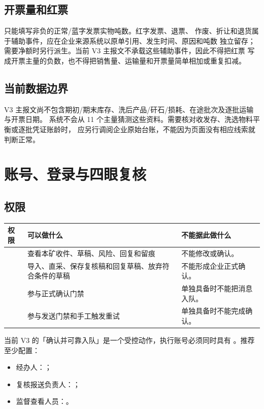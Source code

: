 \documentclass[UTF8,openany,zihao=-4,fontset=none]{ctexbook}
\begin{document}
\section{开票量和红票}

 只能填写非负的正常/蓝字发票实物吨数。红字发票、退票、
作废、折让和退货属于辅助事件，应在企业来源系统以原单引用、发生时间、原因和吨数
独立留存；需要净额时另行派生。当前 V3 主报文不承载这些辅助事件，因此不得把红票
写成开票主量的负数，也不得把销售量、运输量和开票量简单相加或重复扣减。

\section{当前数据边界}

V3 主报文尚不包含期初/期末库存、洗后产品/矸石/损耗、在途批次及逐批运输与开票日期。
系统不会从 11 个主量猜测这些资料。需要核对收发存、洗选物料平衡或逐批凭证账龄时，
应另行调阅企业原始台账，不能因为页面没有相应线索就判断正常。

\chapter{账号、登录与四眼复核}

\section{权限}

\begin{longtable}{P{26mm}P{57mm}P{61mm}}
\toprule
\textbf{权限} & \textbf{可以做什么} & \textbf{不能据此做什么}\\
\midrule
{} & 查看本矿收件、草稿、风险、回复和留痕 & 不能修改或确认。\\
 & 导入、直采、保存复核稿和回复草稿、放弃符合条件的草稿 & 不能形成企业正式确认。\\
 & 参与正式确认门禁 & 单独具备时不能把消息入队。\\
 & 参与发送门禁和手工触发重试 & 单独具备时不能完成确认。\\
\bottomrule
\end{longtable}

当前 V3 的「确认并可靠入队」是一个受控动作，执行账号必须同时具有
。推荐至少配置：

\begin{itemize}
  \item 经办人：；
  \item 复核报送负责人：；
  \item 监督查看人员：。
\end{itemize}
\end{document}

